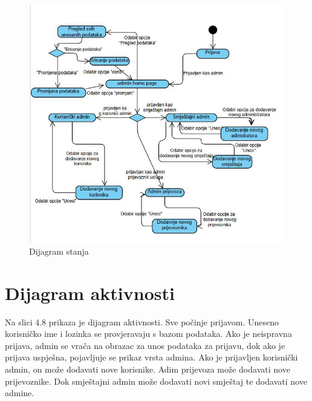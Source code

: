 			\begin{figure}[H]
				\includegraphics[width=\linewidth]{slike/Dijagram stanja.JPG}
				\centering
				\caption{Dijagram stanja}
				\label{fig:Dijagram stanja}
			\end{figure}

			
			
			
			\eject 
		
		\section{Dijagram aktivnosti}

		{Na slici 4.8 prikaza je dijagram aktivnosti. Sve počinje prijavom. Uneseno korisničko ime i lozinka se provjeravaju s bazom podataka. Ako je neispravna prijava, admin se vrača na obrazac za unos podataka za prijavu, dok ako je prijava uspješna, pojavljuje se prikaz vrsta admina.
		Ako je prijavljen korisnički admin, on može dodavati nove korisnike. Adim prijevoza može dodavati nove prijevoznike. Dok smještajni admin može dodavati novi smještaj te dodavati nove admine.}
			
